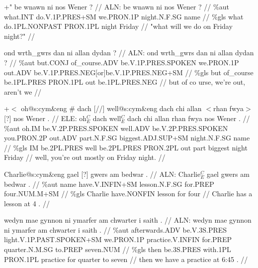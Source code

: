 \documentclass[a4paper,10pt]{article}
\begin{document}
\ex
\begingl[lingstyle=gergl]
\glchat +" be wnawn ni nos Wener ? //
\glsurface ALN:  be wnawn ni nos Wener ?  //
\glauto \%aut  what{\scriptsize .INT} do{\scriptsize .V.1P.PRES+SM} we{\scriptsize .PRON.1P} night{\scriptsize .N.F.SG} name   //
\glmanual \%gls  what do{\scriptsize .1PL.NONPAST} PRON{\scriptsize .1PL} night Friday   //
\gleng "what will we do on Friday night?" //
\endgl
\xe

\ex
\begingl[lingstyle=gergl]
\glchat ond wrth\_gwrs dan ni allan dydan ? //
\glsurface ALN:  ond wrth\_gwrs dan ni allan dydan ?  //
\glauto \%aut  but{\scriptsize .CONJ} of\_course{\scriptsize .ADV} be{\scriptsize .V.1P.PRES.SPOKEN} we{\scriptsize .PRON.1P} out{\scriptsize .ADV} be{\scriptsize .V.1P.PRES.NEG[or]be.V.1P.PRES.NEG+SM}   //
\glmanual \%gls  but of\_course be{\scriptsize .1PL.PRES} PRON{\scriptsize .1PL} out be{\scriptsize .1PL.PRES.NEG}   //
\gleng but of co urse, we're out, aren't we //
\endgl
\xe

\ex
\begingl[lingstyle=gergl]
\glchat +$<$ oh@s:cym\&eng \# dach [//] well@s:cym\&eng dach chi allan $<$rhan fwya$>$ [?] nos Wener . //
\glsurface ELE:  oh$^{C}_{E}$ dach well$^{C}_{E}$ dach chi allan rhan fwya nos Wener .  //
\glauto \%aut  oh{\scriptsize .IM} be{\scriptsize .V.2P.PRES.SPOKEN} well{\scriptsize .ADV} be{\scriptsize .V.2P.PRES.SPOKEN} you{\scriptsize .PRON.2P} out{\scriptsize .ADV} part{\scriptsize .N.F.SG} biggest{\scriptsize .ADJ.SUP+SM} night{\scriptsize .N.F.SG} name   //
\glmanual \%gls  IM be{\scriptsize .2PL.PRES} well be{\scriptsize .2PL.PRES} PRON{\scriptsize .2PL} out part biggest night Friday   //
\gleng well, you're out mostly on Friday night. //
\endgl
\xe

\ex
\begingl[lingstyle=gergl]
\glchat Charlie@s:cym\&eng gael [?] gwers am bedwar . //
\glsurface ALN:  Charlie$^{C}_{E}$ gael gwers am bedwar .  //
\glauto \%aut  name have{\scriptsize .V.INFIN+SM} lesson{\scriptsize .N.F.SG} for{\scriptsize .PREP} four{\scriptsize .NUM.M+SM}   //
\glmanual \%gls  Charlie have{\scriptsize .NONFIN} lesson for four   //
\gleng Charlie has a lesson at 4 . //
\endgl
\xe

\ex
\begingl[lingstyle=gergl]
\glchat wedyn mae gynnon ni ymarfer am chwarter i saith . //
\glsurface ALN:  wedyn mae gynnon ni ymarfer am chwarter i saith .  //
\glauto \%aut  afterwards{\scriptsize .ADV} be{\scriptsize .V.3S.PRES} light{\scriptsize .V.1P.PAST.SPOKEN+SM} we{\scriptsize .PRON.1P} practice{\scriptsize .V.INFIN} for{\scriptsize .PREP} quarter{\scriptsize .N.M.SG} to{\scriptsize .PREP} seven{\scriptsize .NUM}   //
\glmanual \%gls  then be{\scriptsize .3S.PRES} with{\scriptsize .1PL} PRON{\scriptsize .1PL} practice for quarter to seven   //
\gleng then we have a practice at 6:45 . //
\endgl
\xe
\end{document}
